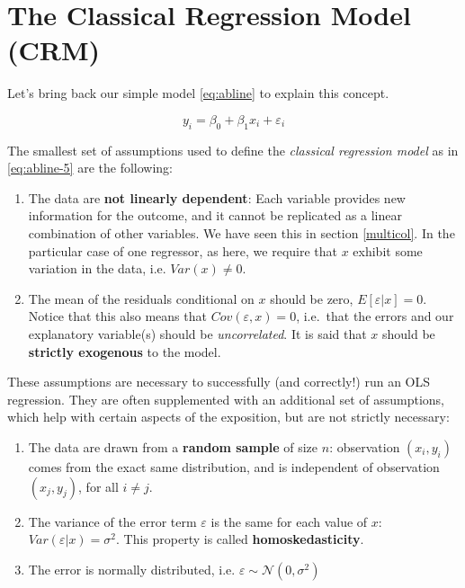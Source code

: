 \documentclass[]{book}
\providecommand{\tightlist}{%
  \setlength{\itemsep}{0pt}\setlength{\parskip}{0pt}}
\begin{document}
\section{The Classical Regression Model (CRM)}\label{class-reg}

Let's bring back our simple model \eqref{eq:abline} to explain this
concept.

\begin{equation}
y_i = \beta_0 + \beta_1 x_i + \varepsilon_i \label{eq:abline-5}
\end{equation}

The smallest set of assumptions used to define the \emph{classical
regression model} as in \eqref{eq:abline-5} are the following:

\begin{enumerate}
\def\labelenumi{\arabic{enumi}.}
\tightlist
\item
  The data are \textbf{not linearly dependent}: Each variable provides
  new information for the outcome, and it cannot be replicated as a
  linear combination of other variables. We have seen this in section
  \ref{multicol}. In the particular case of one regressor, as here, we
  require that \(x\) exhibit some variation in the data, i.e.
  \(Var(x)\neq 0\).
\item
  The mean of the residuals conditional on \(x\) should be zero,
  \(E[\varepsilon|x] = 0\). Notice that this also means that
  \(Cov(\varepsilon,x) = 0\), i.e.~that the errors and our explanatory
  variable(s) should be \emph{uncorrelated}. It is said that \(x\)
  should be \textbf{strictly exogenous} to the model.
\end{enumerate}

These assumptions are necessary to successfully (and correctly!) run an
OLS regression. They are often supplemented with an additional set of
assumptions, which help with certain aspects of the exposition, but are
not strictly necessary:

\begin{enumerate}
\def\labelenumi{\arabic{enumi}.}
\setcounter{enumi}{2}
\tightlist
\item
  The data are drawn from a \textbf{random sample} of size \(n\):
  observation \((x_i,y_i)\) comes from the exact same distribution, and
  is independent of observation \((x_j,y_j)\), for all \(i\neq j\).
\item
  The variance of the error term \(\varepsilon\) is the same for each
  value of \(x\): \(Var(\varepsilon|x) = \sigma^2\). This property is
  called \textbf{homoskedasticity}.
\item
  The error is normally distributed, i.e.
  \(\varepsilon \sim \mathcal{N}(0,\sigma^2)\)
\end{enumerate}
\end{document}
